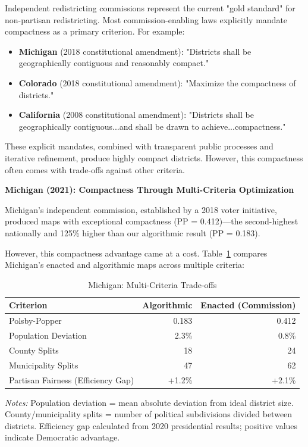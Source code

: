 Independent redistricting commissions represent the current "gold standard" for non-partisan redistricting. Most commission-enabling laws explicitly mandate compactness as a primary criterion. For example:

\begin{itemize}
\item \textbf{Michigan} (2018 constitutional amendment): "Districts shall be geographically contiguous and reasonably compact."
\item \textbf{Colorado} (2018 constitutional amendment): "Maximize the compactness of districts."
\item \textbf{California} (2008 constitutional amendment): "Districts shall be geographically contiguous...and shall be drawn to achieve...compactness."
\end{itemize}

These explicit mandates, combined with transparent public processes and iterative refinement, produce highly compact districts. However, this compactness often comes with trade-offs against other criteria.

\textbf{Michigan (2021): Compactness Through Multi-Criteria Optimization}

Michigan's independent commission, established by a 2018 voter initiative, produced maps with exceptional compactness (PP = 0.412)—the second-highest nationally and 125\% higher than our algorithmic result (PP = 0.183).

However, this compactness advantage came at a cost. Table~\ref{tab:michigan_tradeoffs} compares Michigan's enacted and algorithmic maps across multiple criteria:

\begin{table}[h]
\centering
\caption{Michigan: Multi-Criteria Trade-offs}
\label{tab:michigan_tradeoffs}
\begin{tabular}{lrr}
\toprule
\textbf{Criterion} & \textbf{Algorithmic} & \textbf{Enacted (Commission)} \\
\midrule
Polsby-Popper & 0.183 & 0.412 \\
Population Deviation & 2.3\% & 0.8\% \\
County Splits & 18 & 24 \\
Municipality Splits & 47 & 62 \\
Partisan Fairness (Efficiency Gap) & +1.2\% & +2.1\% \\
\bottomrule
\end{tabular}
\medskip
\begin{minipage}{\textwidth}
\small
\textit{Notes:} Population deviation = mean absolute deviation from ideal district size. County/municipality splits = number of political subdivisions divided between districts. Efficiency gap calculated from 2020 presidential results; positive values indicate Democratic advantage.
\end{minipage}
\end{table}

